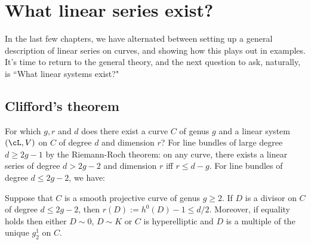 
%
%
%
%
%
%

\chapter{What linear series exist?}\label{Brill-Noether}

In the last few chapters, we have alternated between setting up a general description of linear series on curves, and showing how this plays out in examples. It's time to return to the general theory, and the next question to ask, naturally, is ``What linear systems exist?"

\section{Clifford's theorem}

For which $g, r$ and $d$ does there exist a curve $C$ of genus $g$ and a linear system $(\cL,V)$ on $C$ of degree $d$ and dimension $r$? For line bundles of large degree $d \geq 2g-1$ by the Riemann-Roch theorem: on any curve, there exists a linear series of degree $d > 2g-2$ and dimension $r$ iff $r \leq d-g$. For line bundles of degree $d \leq 2g-2$, we have:

\begin{theorem}\label{Clifford}
Suppose that $C$ is a smooth projective curve of genus $g\geq 2$. If $D$ is a divisor on $C$ of degree $d \leq 2g-2$, then $r(D) := h^0(D) - 1 \leq d/2$. Moreover, if equality holds then either $D\sim 0$, $D\sim K$ or
 $C$ is hyperelliptic and $D$ is a multiple of the unique $g^1_2$ on $C$.
\end{theorem}

